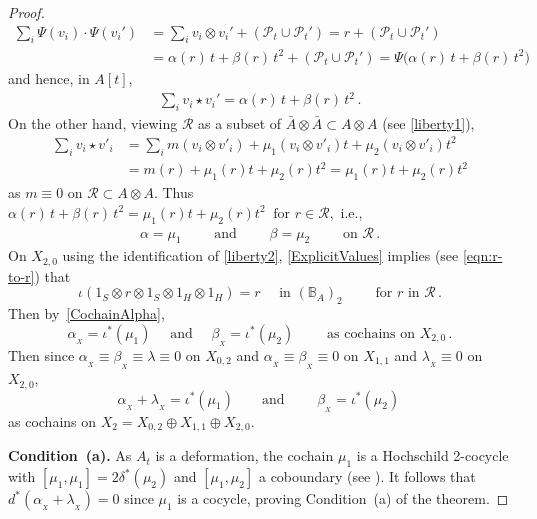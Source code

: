 \documentclass[11pt]{amsart}
\numberwithin{equation}{section}
\newcommand{\X}{_X}
\newcommand{\alphax}{\alpha_{\X}}
\newcommand{\betax}{\beta_{\X}}
\newcommand{\lambdax}{\lambda_{\X}}
\newcommand{\A}{A}%
\newcommand{\sA}{A }
\newcommand{\R}{\mathcal{R}}
\renewcommand{\P}{\mathcal{P}}
\newcommand{\BB}{\mathbb{B}} %
\renewcommand{\_}[1]{\mbox{$_{\left( #1 \right)}$}}
\newcommand{\ot}{\otimes}
\begin{document}
{\begin{proof}
$$
\begin{aligned}
\sum_i \Psi(v_i)\cdot \Psi(v_i')
&=
\sum_i v_i\ot v_i' + (\P_t\cup\P_t')
=
r+ (\P_t\cup\P_t')
\\ &=
\alpha(r)\, t+\beta(r)\, t^2+ (\P_t\cup\P_t')
=\Psi\Big(
\alpha(r)\, t+\beta(r)\, t^2\Big)
\end{aligned}
$$
and hence, in $\A[t]$,
$$
\begin{aligned}
\sum_i v_i\star v_i'
=
\alpha(r)\, t+\beta(r)\, t^2
\, .
\end{aligned}
$$
On the other hand, viewing $\R$ as a subset of $\bar A\ot \bar A \subset A\ot A$
(see \cref{liberty1}),
$$
    \begin{aligned}
      \sum_i  v_i\star v'_i 
&=
      \sum_i m(v_i\ot v'_i) + \mu_1(v_i\ot v'_i)t + \mu_2(v_i\ot
      v'_i)t^2
\\&= m(r) + \mu_1(r)t + \mu_2(r)t^2 
= \mu_1(r)t + \mu_2(r)t^2 
    \end{aligned}
    $$
    as $m\equiv 0$ on $\R\subset A\ot A$.
Thus
$
\alpha(r)\, t+\beta(r)\, t^2 = \mu_1(r)t + \mu_2(r)t^2 
\ \text{ for } r \in \R,
$
       i.e.,
\begin{equation}\label{MultiplicationMapsAreAlphaBeta}
    \begin{aligned}
            \alpha
      =
      \mu_1      \qquad\text{ and }
      \qquad
      \beta
      =
      \mu_2
      \qquad\text{ on $\R$}
      \, .
    \end{aligned}
\end{equation}
%
     On $X_{2,0}$ using the identification of \cref{liberty2},
     \cref{ExplicitValues} implies (see \cref{eqn:r-to-r}) that
$$\iota (1_S\ot r\ot 1_S\ot 1_H\ot 1_H) =
r 
\quad\text{ in } (\BB_A)_2
\qquad\text{ for } r \text{ in } \R \, .
$$
Then by~\cref{CochainAlpha},
$$
\alphax = \iota^* (\mu_1)
\quad\text{ and }\quad
\betax = \iota^*(\mu_2)
\qquad\text{ as cochains on $X_{2,0}$}
  \, .
$$
Then since
$\alphax\equiv \betax\equiv \lambda \equiv 0$
on $X_{0,2}$ and $\alphax\equiv \betax\equiv 0$ on $X_{1,1}$
and $\lambdax\equiv 0$ on $X_{2,0}$,
    $$
    \alphax+\lambdax = \iota^*(\mu_1)
    \qquad\text{and }\qquad
    \betax = \iota^*(\mu_2)
    \, 
    $$
    as cochains on $X_2 = X_{0,2}\oplus X_{1,1}\oplus X_{2,0}$.
    
\vspace{2ex}

{\bf Condition~(a).}
As $\A_t$ is a deformation,  the    cochain $\mu_1$ 
  is a Hochschild 2-cocycle with $[\mu_1,\mu_1]=2\delta^*(\mu_2)$
  and $[\mu_1,\mu_2]$ a coboundary
  (see \cite{GerstenhaberSchack}). 
  It follows that $d^*(\alphax +\lambdax)=0$ since $\mu_1$ is a cocycle,
proving Condition~(a) of the theorem.
 

\end{proof}}
\end{document}

